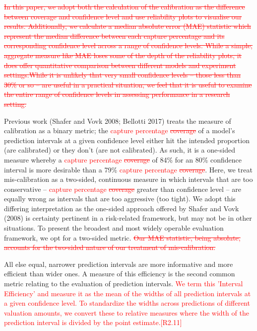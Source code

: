 \documentclass[colTwo]{anon}
\theoremstyle{definition}
\begin{document}
\textcolor{red}{ \st{In this paper, we adopt both the calculation of the calibration as the difference between coverage and confidence level and use reliability plots to visualise our results. Additionally, we calculate a median absolute error (MAE) statistic which represent the median difference between each capture percentage and its corresponding confidence level across a range of confidence levels.  While a simple, aggregate measure like MAE loses some of the depth of the reliability plots, it does offer quantitative comparison between different models and experiment settings.While it is unlikely that very small confidence levels -- those less than 30\% or so -- are useful in a practical situation, we feel that it is useful to examine the entire range of confidence levels in assessing performance in a research setting.}}

Previous work (Shafer and Vovk 2008; Bellotti 2017) treats the measure of calibration as a binary metric; the \textcolor{red}{capture percentage \st{coverage}} of a model’s prediction intervals at a given confidence level either hit the intended proportion (are calibrated) or they don’t (are not calibrated).  As such, it is a one-sided measure whereby a \textcolor{red}{capture percentage \st{coverage}} of 84\% for an 80\% confidence interval is more desirable than a 79\% \textcolor{red}{capture percentage \st{coverage}}.  Here, we treat mis-calibration as a two-sided, continuous measure in which intervals that are too conservative -- \textcolor{red}{capture percentage \st{coverage}} greater than confidence level -- are equally wrong as intervals that are too aggressive (too tight). We adopt this differing interpretation as the one-sided approach offered by Shafer and Vovk (2008) is certainty pertinent in a risk-related framework, but may not be in other situations. To present the broadest and most widely operable evaluation framework, we opt for a two-sided metric. \textcolor{red}{\st{Our MAE statistic, being absolute, accounts for the two-sided nature of our treatment of mis-calibration.}}  

All else equal, narrower prediction intervals are more informative and more efficient than wider ones.  A measure of this efficiency is the second common metric relating to the evaluation of prediction intervals. \textcolor{red}{We term this 'Interval Efficiency' and measure it as the mean of the widths of all prediction intervals at a given confidence level. To standardize the widths across predictions of different valuation amounts, we convert these to relative measures where the width of the prediction interval is divided by the point estimate.[R2.11]} 
\end{document}
